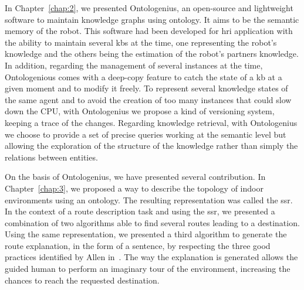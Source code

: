 In Chapter~\ref{chap:2}, we presented Ontologenius, an open-source and lightweight software to maintain knowledge graphs using ontology. It aims to be the semantic memory of the robot. This software had been developed for \acrshort{hri} application with the ability to maintain several \acrlong{kb}s at the time, one representing the robot's knowledge and the others being the estimation of the robot's partners knowledge. In addition, regarding the management of several instances at the time, Ontologenious comes with a deep-copy feature to catch the state of a \acrshort{kb} at a given moment and to modify it freely. To represent several knowledge states of the same agent and to avoid the creation of too many instances that could slow down the CPU, with Ontologenius we propose a kind of versioning system, keeping a trace of the changes. Regarding knowledge retrieval, with Ontologenius we choose to provide a set of precise queries working at the semantic level but allowing the exploration of the structure of the knowledge rather than simply the relations between entities.

On the basis of Ontologenius, we have presented several contribution. In Chapter~\ref{chap:3}, we proposed a way to describe the topology of indoor environments using an ontology. The resulting representation was called the \acrfull{ssr}. In the context of a route description task and using the \acrshort{ssr}, we presented a combination of two algorithms able to find several routes leading to a destination. Using the same representation, we presented a third algorithm to generate the route explanation, in the form of a sentence, by respecting the three good practices identified by Allen in~\cite{allen_2000_principles}. The way the explanation is generated allows the guided human to perform an imaginary tour of the environment, increasing the chances to reach the requested destination.

